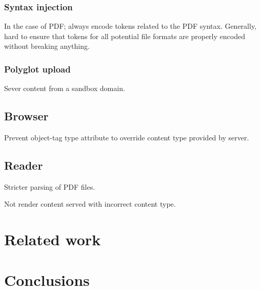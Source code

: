 \documentclass[10pt, conference, compsocconf]{IEEEtran}
\begin{document}
\subsubsection{Syntax injection}

In the case of PDF; always encode tokens related to the PDF 
syntax. Generally, hard to ensure that tokens for all potential 
file formats are properly encoded without breaking anything.


\subsubsection{Polyglot upload}

Sever content from a sandbox domain.


\subsection{Browser}

Prevent object-tag type attribute to override content type 
provided by server. 


\subsection{Reader}

Stricter parsing of PDF files.

Not render content served with incorrect content type.









\section{Related work}








\section{Conclusions}










\end{document}
